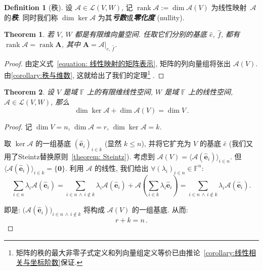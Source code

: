 \documentclass[openany]{ctexbook}
\newcommand*{\indexbf}[1]{\emph{\textbf{#1}}\index{#1}} %
\theoremstyle{plain}
\newtheorem{theorem}{Theorem}[section] %
\theoremstyle{definition}
\newtheorem{definition}{Definition}[section] %
\newcommand*{\basis}[1]{\hat{\boldsymbol{#1}}} %
\newcommand*{\bv}{\boldsymbol} %
\newcommand*{\inbasis}[2]{\left.%
	{#1}\right|_{#2}
}
\DeclareMathOperator{\rank}{rank}
\begin{document}
\begin{definition}[秩]
	设 $\mathscr A \in \mathcal L(V, W)$, 记 $\rank \mathscr A := \dim \mathscr A(V)$ 为线性映射~$\mathscr A$ 的\indexbf{秩}.
	同时我们称 $\dim \ker \mathscr A$ 为其\indexbf{亏数}或\indexbf{零化度} (nullity).
\end{definition}

\begin{theorem}
	若 $V$, $W$ 都是有限维向量空间. 任取它们分别的基底 $\hat e$, $\hat f$, 都有 $\rank \mathscr A = \rank \bv A$, 其中 $\bv A = \inbasis{\mathscr A}{\hat e,\, \hat f}$.
\end{theorem}
\begin{proof}
	由定义式~\eqref{equation: 线性映射的矩阵表示}, 矩阵的列向量组将张出 $\mathscr A (V)$.
	由\ref{corollary:秩与维数}, 这就给出了我们的定理\footnote{%
	矩阵的秩的最大非零子式定义和列向量组定义等价已由推论~\ref{corollary:线性相关与坐标阶数}保证.}%
	.
\end{proof}

\begin{theorem}\label{theorem: 核和像的维数}
	设 $V$ 是域 $\mathbb F$ 上的有限维线性空间, $W$ 是域 $\mathbb F$ 上的线性空间, $\mathscr A \in \mathcal L(V, W)$, 那么
	\begin{equation*}
		\dim \ker \mathscr A + \dim \mathscr A(V) = \dim V\,. 
	\end{equation*}
\end{theorem}
\begin{proof}
	记 $\dim V = n$, $\dim \mathscr A = r$, $\dim \ker \mathscr A = k$.

	取 $\ker \mathscr A$ 的一组基底 $(\basis e_i)_{i \in k}$ (显然 $k \leq n$), 并将它扩充为 $V$ 的基底 $\hat e$ (我们又用了Steintz替换原则~\ref{theorem: Steintz}).
	考虑到 $\mathscr A(V) = \langle \mathscr A(\basis e_i) \rangle_{i \in n}$.
	但 $\langle \mathscr A(\basis e_i) \rangle_{i \in k} = \{\bv 0\}$.
	利用 $\mathscr A$ 的线性, 我们给出 $\forall (\lambda_i)_{i \in n} \in \mathbb F^n$:
	\begin{equation*}
		\sum_{i \in n} \lambda_i \mathscr A(\basis e_i) 
			= \sum_{i \in n\,\wedge\, i \notin k} \lambda_i \mathscr A(\basis e_i) 
				+  \mathscr A\left( 
					\sum_{i \in k} \lambda_i \basis e_i \right)
			= \sum_{i \in n\,\wedge\, i \notin k} \lambda_i \mathscr A(\basis e_i) .
	\end{equation*}
	
	即是: $\big(\mathscr A(\basis e_i)\big)_{i \in n\,\wedge\, i \notin k}$ 将构成 $\mathscr A(V)$ 的一组基底. 从而:
	\begin{equation*}
		r + k = n\,.
	\end{equation*}
\end{proof}
\end{document}
